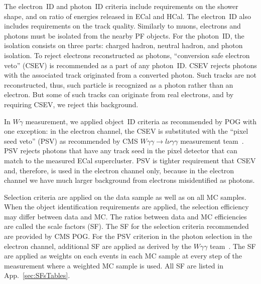 
The electron~ID and photon~ID criteria include requirements on the shower shape, and on ratio of energies released in ECal and HCal. The electron~ID also includes requirements on the track quality. Similarly to muons, electrons and photons must be isolated from the nearby PF objects. For the photon~ID, the isolation consists on three parts: charged hadron, neutral hadron, and photon isolation. To reject electrons reconstructed as photons, ``conversion safe electron veto'' (CSEV) is recommended as a part of any photon~ID. CSEV rejects photons with the associated track originated from a converted photon. Such tracks are not reconstructed, thus, such particle is recognized as a photon rather than an electron. But some of such tracks can originate from real electrons, and by requiring CSEV, we reject this background.



In $W\gamma$ measurement, we applied object~ID criteria as recommended by POG with one exception: in the electron channel, the CSEV is substituted with the ``pixel seed veto'' (PSV) as recommended by CMS $W\gamma\gamma \rightarrow l\nu\gamma\gamma$ measurement team~\cite{ref_Wgg8TeV}. PSV rejects photons that have any track seed in the pixel detector that can match to the measured ECal supercluster. PSV is tighter requirement that CSEV and, therefore, is used in the electron channel only, because in the electron channel we have much larger background from electrons misidentified as photons. %

Selection criteria are applied on the data sample as well as on all MC samples. When the object identification requirements are applied, the selection efficiency may differ between data and MC. The ratios between data and MC efficiencies are called the scale factors (SF). The SF for the selection criteria recommended are provided by CMS POG. For the PSV criterion in the photon selection in the electron channel, additional SF are applied as derived by the $W\gamma\gamma$ team~\cite{ref_Wgg8TeV}. The SF are applied as weights on each events in each MC sample at every step of the measurement where a weighted MC sample is used. All SF are listed in App.~\ref{sec:SFsTables}.


